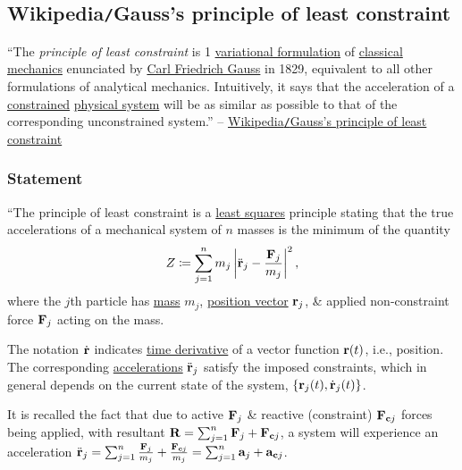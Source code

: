 \documentclass{article}
\begin{document}

\subsection{Wikipedia{\tt/}Gauss's principle of least constraint}
``The \textit{principle of least constraint} is 1 \href{https://en.wikipedia.org/wiki/Variational_principle}{variational formulation} of \href{https://en.wikipedia.org/wiki/Classical_mechanics}{classical mechanics} enunciated by \href{https://en.wikipedia.org/wiki/Carl_Friedrich_Gauss}{Carl Friedrich Gauss} in 1829, equivalent to all other formulations of analytical mechanics. Intuitively, it says that the acceleration of a \href{https://en.wikipedia.org/wiki/Constraint_(classical_mechanics)}{constrained} \href{https://en.wikipedia.org/wiki/Physical_system}{physical system} will be as similar as possible to that of the corresponding unconstrained system.'' -- \href{https://en.wikipedia.org/wiki/Gauss%27s_principle_of_least_constraint}{Wikipedia{\tt/}Gauss's principle of least constraint}

\subsubsection{Statement}
``The principle of least constraint is a \href{https://en.wikipedia.org/wiki/Least_squares}{least squares} principle stating that the true accelerations of a mechanical system of $n$ masses is the minimum of the quantity
\begin{align*}
	Z\coloneqq\sum_{j=1}^n m_j\left|\ddot{\bf r}_j - \frac{{\bf F}_j}{m_j}\right|^2,
\end{align*}
where the $j$th particle has \href{https://en.wikipedia.org/wiki/Mass}{mass} $m_j$, \href{https://en.wikipedia.org/wiki/Position_vector}{position vector} ${\bf r}_j$, \& applied non-constraint force ${\bf F}_j$ acting on the mass.

The notation $\dot{\bf r}$ indicates \href{https://en.wikipedia.org/wiki/Time_derivative}{time derivative} of a vector function ${\bf r}(t)$, i.e., position. The corresponding \href{https://en.wikipedia.org/wiki/Acceleration}{accelerations} $\ddot{\bf r}_j$ satisfy the imposed constraints, which in general depends on the current state of the system, $\{{\bf r}_j(t),\dot{\bf r}_j(t)\}$.

It is recalled the fact that due to active ${\bf F}_j$ \& reactive (constraint) ${\bf F}_{{\bf c}j}$ forces being applied, with resultant ${\bf R} = \sum_{j=1}^n {\bf F}_j + {\bf F}_{{\bf c}j}$, a system will experience an acceleration $\ddot{\bf r}_j = \sum_{j=1}^n \frac{{\bf F}_j}{m_j} + \frac{{\bf F}_{{\bf c}j}}{m_j} = \sum_{j=1}^n {\bf a}_j + {\bf a}_{{\bf c}j}$.
\end{document}
